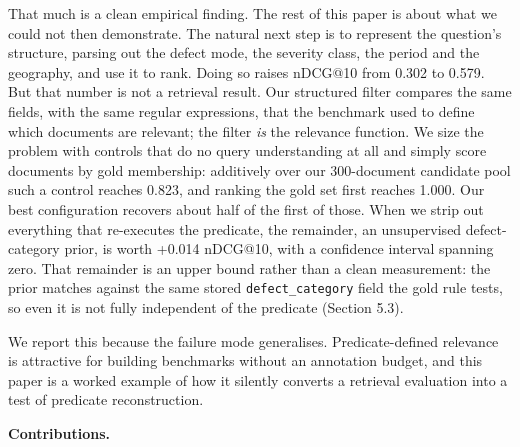 \documentclass[runningheads]{llncs}
\begin{document}
That much is a clean empirical finding. The rest of this paper is about what we could not then demonstrate. The natural next step is to represent the question's structure, parsing out the defect mode, the severity class, the period and the geography, and use it to rank. Doing so raises nDCG@10 from 0.302 to 0.579. But that number is not a retrieval result. Our structured filter compares the same fields, with the same regular expressions, that the benchmark used to define which documents are relevant; the filter \textit{is} the relevance function. We size the problem with controls that do no query understanding at all and simply score documents by gold membership: additively over our 300-document candidate pool such a control reaches 0.823, and ranking the gold set first reaches 1.000. Our best configuration recovers about half of the first of those. When we strip out everything that re-executes the predicate, the remainder, an unsupervised defect-category prior, is worth +0.014 nDCG@10, with a confidence interval spanning zero. That remainder is an upper bound rather than a clean measurement: the prior matches against the same stored \texttt{defect\_category} field the gold rule tests, so even it is not fully independent of the predicate (Section 5.3).

We report this because the failure mode generalises. Predicate-defined relevance is attractive for building benchmarks without an annotation budget, and this paper is a worked example of how it silently converts a retrieval evaluation into a test of predicate reconstruction.

\textbf{Contributions.}
\end{document}
